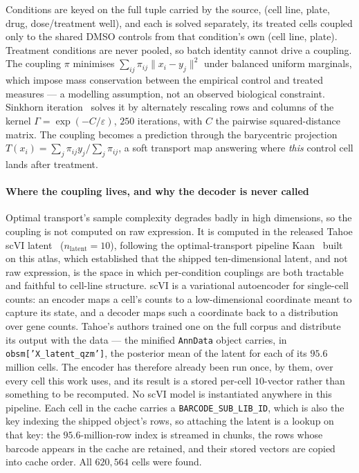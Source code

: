 Conditions are keyed on the full tuple carried by the source, (cell line, plate,
drug, dose/treatment well), and each is solved separately, its treated cells
coupled only to the shared DMSO controls from that condition's own (cell line,
plate). Treatment conditions are never pooled, so batch identity cannot drive a
coupling. The coupling $\pi$ minimises $\sum_{ij}\pi_{ij}\lVert x_i - y_j\rVert^2$
under balanced uniform marginals, which impose mass conservation between the
empirical control and treated measures --- a modelling assumption, not an observed
biological constraint. Sinkhorn iteration~\cite{cuturi} solves it by alternately
rescaling rows and columns of the kernel $\Gamma = \exp(-C/\varepsilon)$, $250$
iterations, with $C$ the pairwise squared-distance matrix. The coupling becomes a
prediction through the barycentric projection
$T(x_i) = \sum_j \pi_{ij} y_j \big/ \sum_j \pi_{ij}$, a soft transport map
answering where \emph{this} control cell lands after treatment.

\paragraph{Where the coupling lives, and why the decoder is never called}
Optimal transport's sample complexity degrades badly in high dimensions, so the
coupling is not computed on raw expression. It is computed in the released Tahoe scVI latent~\cite{scvi} ($n_{\textrm{latent}} = 10$), following the optimal-transport pipeline Kaan~\cite{mertkaan} built on this atlas, which established that the shipped ten-dimensional latent, and not raw expression, is the space in which per-condition couplings are both tractable and faithful to cell-line structure. scVI is a variational
autoencoder for single-cell counts: an encoder maps a cell's counts to a
low-dimensional coordinate meant to capture its state, and a decoder maps such a
coordinate back to a distribution over gene counts. Tahoe's authors trained one
on the full corpus and distribute its output with the data --- the minified
\texttt{AnnData} object carries, in \texttt{obsm['X\_latent\_qzm']}, the posterior
mean of the latent for each of its $95.6$ million cells. The encoder has therefore
already been run once, by them, over every cell this work uses, and its result is
a stored per-cell $10$-vector rather than something to be recomputed. No scVI
model is instantiated anywhere in this pipeline. Each cell in the cache carries a
\texttt{BARCODE\_SUB\_LIB\_ID}, which is also the key indexing the shipped object's
rows, so attaching the latent is a lookup on that key: the $95.6$-million-row index
is streamed in chunks, the rows whose barcode appears in the cache are retained,
and their stored vectors are copied into cache order. All $620{,}564$ cells were
found.

